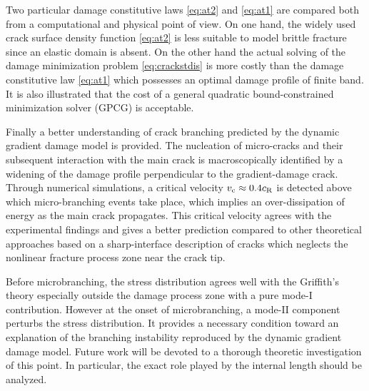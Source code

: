 Two particular damage constitutive laws \eqref{eq:at2} and \eqref{eq:at1} are compared both from a computational and physical point of view. On one hand, the widely used crack surface density function \eqref{eq:at2} is less suitable to model brittle fracture since an elastic domain is absent. On the other hand the actual solving of the damage minimization problem \eqref{eq:crackstdis} is more costly than the damage constitutive law \eqref{eq:at1} which possesses an optimal damage profile of finite band. It is also illustrated that the cost of a general quadratic bound-constrained minimization solver (GPCG) is acceptable.

Finally a better understanding of crack branching predicted by the dynamic gradient damage model is provided. The nucleation of micro-cracks and their subsequent interaction with the main crack is macroscopically identified by a widening of the damage profile perpendicular to the gradient-damage crack. Through numerical simulations, a critical velocity $v_{\mathrm{c}}\approx 0.4c_\mathrm{R}$ is detected above which micro-branching events take place, which implies an over-dissipation of energy as the main crack propagates. This critical velocity agrees with the experimental findings and gives a better prediction compared to other theoretical approaches based on a sharp-interface description of cracks which neglects the nonlinear fracture process zone near the crack tip.

Before microbranching, the stress distribution agrees well with the Griffith's theory especially outside the damage process zone with a pure mode-I contribution. However at the onset of microbranching, a mode-II component perturbs the stress distribution. It provides a necessary condition toward an explanation of the branching instability reproduced by the dynamic gradient damage model. Future work will be devoted to a thorough theoretic investigation of this point. In particular, the exact role played by the internal length should be analyzed.

